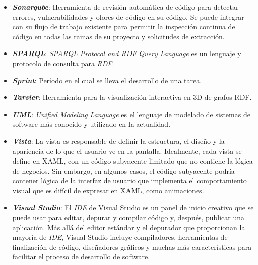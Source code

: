 \begin{itemize}
    \item \textbf{\textit{Sonarqube}}: Herramienta de revisión automática 
    de código para detectar errores, vulnerabilidades y olores de código 
    en su código. Se puede integrar con su flujo de trabajo existente 
    para permitir la inspección continua de código en todas las ramas 
    de su proyecto y solicitudes de extracción.

    \item \textbf{\textit{SPARQL}}: \emph{SPARQL Protocol and RDF Query 
    Language} es un lenguaje y protocolo de consulta para \emph{RDF}. 

    \item \textbf{\textit{Sprint}}: Período en el cual se lleva el 
    desarrollo de una tarea.

    \item \textbf{\textit{Tarsier}}: Herramienta para la visualización 
    interactiva en 3D de grafos RDF.\@

    \item \textbf{\textit{UML}}: \emph{Unified Modeling Language} es el 
    lenguaje de modelado de sistemas de software más conocido y utilizado 
    en la actualidad.

    \item \textbf{\textit{Vista}}: La vista es responsable de definir 
    la estructura, el diseño y la apariencia de lo que el usuario ve 
    en la pantalla. Idealmente, cada vista se define en XAML, con un 
    código subyacente limitado que no contiene la lógica de negocios. 
    Sin embargo, en algunos casos, el código subyacente podría contener 
    lógica de la interfaz de usuario que implementa el comportamiento 
    visual que es difícil de expresar en XAML, como animaciones.

    \item \textbf{\textit{Visual Studio}}: El \emph{IDE} de Visual Studio 
    es un panel de inicio creativo que se puede usar para editar, 
    depurar y compilar código y, después, publicar una aplicación.
    Más allá del editor estándar y el depurador que proporcionan la 
    mayoría de \emph{IDE}, Visual Studio incluye compiladores, herramientas 
    de finalización de código, diseñadores gráficos y muchas más 
    características para facilitar el proceso de desarrollo de software.


\end{itemize}
